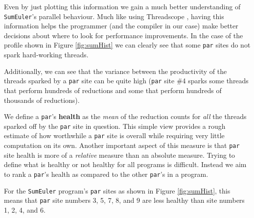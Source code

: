 Even by just plotting this information we gain a much better understanding of
\verb|SumEuler|'s parallel behaviour. Much like using Threadscope
\citep{Jones2009Tuning}, having this information helps the programmer (and the
compiler in our case) make better decisions about where to look for performance
improvements. In the case of the profile shown in Figure \ref{fig:sumHist} we
can clearly see that some \verb|par| sites do not spark hard-working threads.

Additionally, we can see that the variance between the productivity of the
threads sparked by a \verb|par| site can be quite high (\verb|par| site \#4
sparks some threads that perform hundreds of reductions and some that
perform hundreds of thousands of reductions).

We define a \verb|par|'s \textbf{health} as the \emph{mean} of the reduction
counts for \emph{all} the threads sparked off by the \verb|par| site in
question. This simple view provides a rough estimate of how worthwhile a
\verb|par| site is overall while requiring very little computation on its own.
Another important aspect of this measure is that \verb|par| site health is more
of a \emph{relative} measure than an absolute measure. Trying to define what is
healthy or not healthy for all programs is difficult. Instead we aim to rank a
\verb|par|'s health as compared to the other \verb|par|'s in a program.

For the \verb|SumEuler| program's \verb|par| sites as shown in Figure
\ref{fig:sumHist}, this means that \verb|par| site numbers 3, 5, 7, 8, and 9
are less healthy than site numbers 1, 2, 4, and 6.
